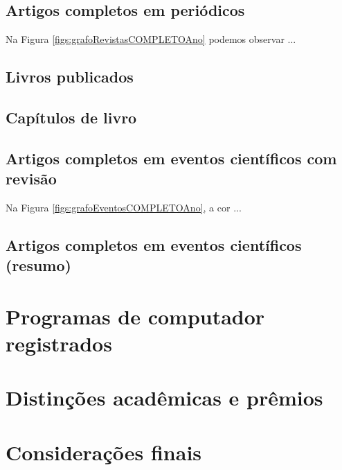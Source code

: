 \subsection{Artigos completos em periódicos}




Na Figura \ref{figs:grafoRevistasCOMPLETOAno} podemos observar ...

\subsection{Livros publicados}



\subsection{Capítulos de livro}



\subsection{Artigos completos em eventos científicos com revisão}



Na Figura \ref{figs:grafoEventosCOMPLETOAno}, a cor ...

\subsection{Artigos completos em eventos científicos (resumo)}



\section{Programas de computador registrados}\label{sec:registroSofware}



\section{Distinções acadêmicas e prêmios}



\section{Considerações finais}





